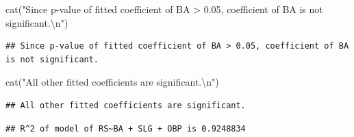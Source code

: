 \documentclass[
]{article}
\newenvironment{Shaded}{\begin{snugshade}}{\end{snugshade}}
\newcommand{\AttributeTok}[1]{\textcolor[rgb]{0.77,0.63,0.00}{#1}}
\newcommand{\ConstantTok}[1]{\textcolor[rgb]{0.00,0.00,0.00}{#1}}
\newcommand{\DecValTok}[1]{\textcolor[rgb]{0.00,0.00,0.81}{#1}}
\newcommand{\FunctionTok}[1]{\textcolor[rgb]{0.00,0.00,0.00}{#1}}
\newcommand{\NormalTok}[1]{#1}
\newcommand{\SpecialCharTok}[1]{\textcolor[rgb]{0.00,0.00,0.00}{#1}}
\newcommand{\StringTok}[1]{\textcolor[rgb]{0.31,0.60,0.02}{#1}}
\begin{document}
\begin{Shaded}
\begin{Highlighting}[]
\FunctionTok{cat}\NormalTok{(}\StringTok{"Since p{-}value of fitted coefficient of BA \textgreater{} 0.05, coefficient of BA is not significant.}\SpecialCharTok{\textbackslash{}n}\StringTok{"}\NormalTok{)}
\end{Highlighting}
\end{Shaded}

\begin{verbatim}
## Since p-value of fitted coefficient of BA > 0.05, coefficient of BA is not significant.
\end{verbatim}

\begin{Shaded}
\begin{Highlighting}[]
\FunctionTok{cat}\NormalTok{(}\StringTok{"All other fitted coefficients are significant.}\SpecialCharTok{\textbackslash{}n}\StringTok{"}\NormalTok{)}
\end{Highlighting}
\end{Shaded}

\begin{verbatim}
## All other fitted coefficients are significant.
\end{verbatim}

\begin{Shaded}
\end{Shaded}

\begin{verbatim}
## R^2 of model of RS~BA + SLG + OBP is 0.9248834
\end{verbatim}

\begin{Shaded}
\end{Shaded}
\end{document}
